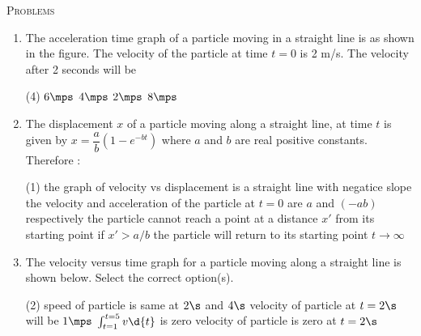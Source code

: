 \documentclass{article}
\newcommand{\itemstared}{\refstepcounter{enumi}\item[$^\star$\theenumi.]}
\renewcommand{\ans}{\quad}
\begin{document}
\begin{center}
    \textsc{Problems}
\end{center}
\begin{enumerate}
    \item The acceleration time graph of a particle moving in a straight line is as shown in the figure. The velocity of the particle at time $t=0$ is 2 m/s. The velocity after 2 seconds will be
    \begin{center}
    \end{center}
    \begin{tasks}(4)
        \task $6 \mps$\ans
        \task $4 \mps$
        \task $2 \mps$
        \task $8 \mps$
    \end{tasks}

    \itemstared The displacement $x$ of a particle moving along a straight line, at time $t$ is given by $x = \dfrac{a}{b}(1-e^{-bt})$ where $a$ and $b$ are real positive constants. Therefore :
    \begin{tasks}(1)
        \task the graph of velocity vs displacement is a straight line with negatice slope \ans
        \task the velocity and acceleration of the particle at $t=0$ are $a$ and $(-ab)$ respectively \ans
        \task the particle cannot reach a point at a distance $x'$ from its starting point if $x' >a/b$ \ans
        \task the particle will return to its starting point $ t \to \infty$
    \end{tasks}
 
    
    
    \item The velocity versus time graph for a particle moving along a straight line is shown below. Select the correct option(s).
        \begin{center}
        \end{center}
        \begin{tasks}(2)
            \task speed of particle is same at $2 \s$ and $4 \s$\ans
            \task velocity of particle at $t=2 \s$ will be $1 \mps$
            \task $\int_{t=1}^{t=5}v\d{t}$ is zero \ans
            \task velocity of particle is zero at $t=2 \s$ 
        \end{tasks}


\end{enumerate}
\end{document}
